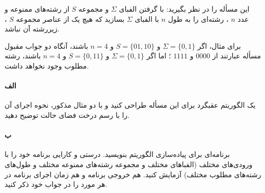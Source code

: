 \documentclass[]{article}
\begin{document}
این مسأله را در نظر بگیرید:
با گرفتن الفبای $\Sigma$ و مجموعه $S$ از رشته‌های ممنوعه و عدد $n$ ، 
رشته‌ای را به‌ طول $n$ با الفبای $\Sigma$ بسازید که هیچ یک از عناصر مجموعه $S$ ، زیررشته آن نباشد.

برای مثال، اگر $\Sigma = \lbrace 0, 1 \rbrace$ و $S = \lbrace 01, 10 \rbrace$ و $n = 4$ باشند،
آنگاه دو جواب مقبول مسأله عبارتند از $0000$ و $1111$ ؛ 
اما اگر $\Sigma = \lbrace 0, 1 \rbrace$ و $S = \lbrace 0, 11 \rbrace$ و $n = 4$ باشند،
رشته مطلوب وجود نخواهد داشت. 

\paragraph*{الف}
یک الگوریتم عقبگرد برای این مسأله طراحی کنید و با دو مثال مذکور، نحوه اجرای آن را با رسم درخت فضای حالت توضیح دهید.

\paragraph*{ب}
برنامه‌ای برای پیاده‌سازی الگوریتم بنویسید.
درستی و کارایی برنامه خود را با ورودی‌های مختلف (الفباهای مختلف و مجموعه رشته‌های ممنوعه مختلف و طول‌های رشته‌های مطلوب مختلف)
آزمایش کنید. هم خروجی برنامه و هم زمان اجرای برنامه در هر مورد را در جواب خود ذکر کنید. 
\end{document}
